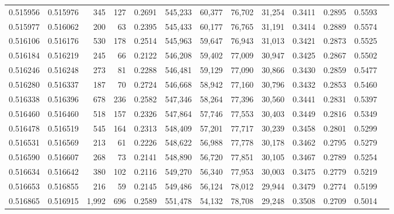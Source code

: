 \begin{tabular}{rrrrrrrrrrrrr}
0.515956 & 0.515976 &   345 &   127 &                                     0.2691 & 545,233 &  60,377 &  76,702 &  31,254 & 0.3411 & 0.2895 & 0.5593 \\
0.515977 & 0.516062 &   200 &    63 &                                     0.2395 & 545,433 &  60,177 &  76,765 &  31,191 & 0.3414 & 0.2889 & 0.5574 \\
0.516106 & 0.516176 &   530 &   178 &                                     0.2514 & 545,963 &  59,647 &  76,943 &  31,013 & 0.3421 & 0.2873 & 0.5525 \\
0.516184 & 0.516219 &   245 &    66 &                                     0.2122 & 546,208 &  59,402 &  77,009 &  30,947 & 0.3425 & 0.2867 & 0.5502 \\
0.516246 & 0.516248 &   273 &    81 &                                     0.2288 & 546,481 &  59,129 &  77,090 &  30,866 & 0.3430 & 0.2859 & 0.5477 \\
0.516280 & 0.516337 &   187 &    70 &                                     0.2724 & 546,668 &  58,942 &  77,160 &  30,796 & 0.3432 & 0.2853 & 0.5460 \\
0.516338 & 0.516396 &   678 &   236 &                                     0.2582 & 547,346 &  58,264 &  77,396 &  30,560 & 0.3441 & 0.2831 & 0.5397 \\
0.516460 & 0.516460 &   518 &   157 &                                     0.2326 & 547,864 &  57,746 &  77,553 &  30,403 & 0.3449 & 0.2816 & 0.5349 \\
0.516478 & 0.516519 &   545 &   164 &                                     0.2313 & 548,409 &  57,201 &  77,717 &  30,239 & 0.3458 & 0.2801 & 0.5299 \\
0.516531 & 0.516569 &   213 &    61 &                                     0.2226 & 548,622 &  56,988 &  77,778 &  30,178 & 0.3462 & 0.2795 & 0.5279 \\
0.516590 & 0.516607 &   268 &    73 &                                     0.2141 & 548,890 &  56,720 &  77,851 &  30,105 & 0.3467 & 0.2789 & 0.5254 \\
0.516634 & 0.516642 &   380 &   102 &                                     0.2116 & 549,270 &  56,340 &  77,953 &  30,003 & 0.3475 & 0.2779 & 0.5219 \\
0.516653 & 0.516855 &   216 &    59 &                                     0.2145 & 549,486 &  56,124 &  78,012 &  29,944 & 0.3479 & 0.2774 & 0.5199 \\
0.516865 & 0.516915 & 1,992 &   696 &                                     0.2589 & 551,478 &  54,132 &  78,708 &  29,248 & 0.3508 & 0.2709 & 0.5014 \\

\end{tabular}
